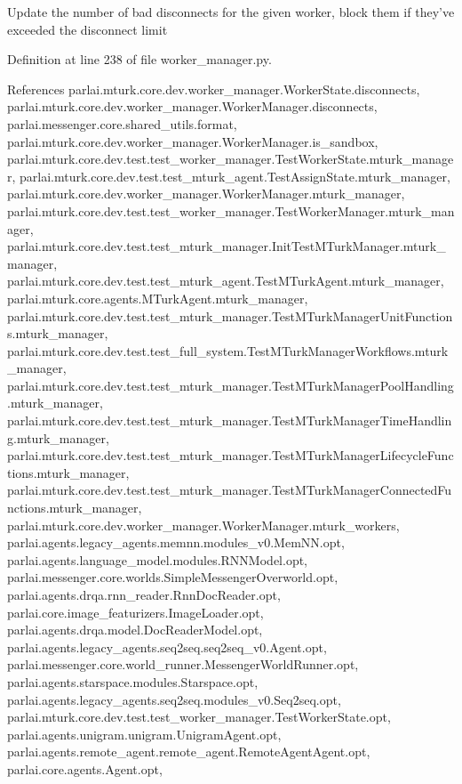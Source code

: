 \begin{DoxyVerb}Update the number of bad disconnects for the given worker, block
them if they've exceeded the disconnect limit
\end{DoxyVerb}
 

Definition at line 238 of file worker\+\_\+manager.\+py.



References parlai.\+mturk.\+core.\+dev.\+worker\+\_\+manager.\+Worker\+State.\+disconnects, parlai.\+mturk.\+core.\+dev.\+worker\+\_\+manager.\+Worker\+Manager.\+disconnects, parlai.\+messenger.\+core.\+shared\+\_\+utils.\+format, parlai.\+mturk.\+core.\+dev.\+worker\+\_\+manager.\+Worker\+Manager.\+is\+\_\+sandbox, parlai.\+mturk.\+core.\+dev.\+test.\+test\+\_\+worker\+\_\+manager.\+Test\+Worker\+State.\+mturk\+\_\+manager, parlai.\+mturk.\+core.\+dev.\+test.\+test\+\_\+mturk\+\_\+agent.\+Test\+Assign\+State.\+mturk\+\_\+manager, parlai.\+mturk.\+core.\+dev.\+worker\+\_\+manager.\+Worker\+Manager.\+mturk\+\_\+manager, parlai.\+mturk.\+core.\+dev.\+test.\+test\+\_\+worker\+\_\+manager.\+Test\+Worker\+Manager.\+mturk\+\_\+manager, parlai.\+mturk.\+core.\+dev.\+test.\+test\+\_\+mturk\+\_\+manager.\+Init\+Test\+M\+Turk\+Manager.\+mturk\+\_\+manager, parlai.\+mturk.\+core.\+dev.\+test.\+test\+\_\+mturk\+\_\+agent.\+Test\+M\+Turk\+Agent.\+mturk\+\_\+manager, parlai.\+mturk.\+core.\+agents.\+M\+Turk\+Agent.\+mturk\+\_\+manager, parlai.\+mturk.\+core.\+dev.\+test.\+test\+\_\+mturk\+\_\+manager.\+Test\+M\+Turk\+Manager\+Unit\+Functions.\+mturk\+\_\+manager, parlai.\+mturk.\+core.\+dev.\+test.\+test\+\_\+full\+\_\+system.\+Test\+M\+Turk\+Manager\+Workflows.\+mturk\+\_\+manager, parlai.\+mturk.\+core.\+dev.\+test.\+test\+\_\+mturk\+\_\+manager.\+Test\+M\+Turk\+Manager\+Pool\+Handling.\+mturk\+\_\+manager, parlai.\+mturk.\+core.\+dev.\+test.\+test\+\_\+mturk\+\_\+manager.\+Test\+M\+Turk\+Manager\+Time\+Handling.\+mturk\+\_\+manager, parlai.\+mturk.\+core.\+dev.\+test.\+test\+\_\+mturk\+\_\+manager.\+Test\+M\+Turk\+Manager\+Lifecycle\+Functions.\+mturk\+\_\+manager, parlai.\+mturk.\+core.\+dev.\+test.\+test\+\_\+mturk\+\_\+manager.\+Test\+M\+Turk\+Manager\+Connected\+Functions.\+mturk\+\_\+manager, parlai.\+mturk.\+core.\+dev.\+worker\+\_\+manager.\+Worker\+Manager.\+mturk\+\_\+workers, parlai.\+agents.\+legacy\+\_\+agents.\+memnn.\+modules\+\_\+v0.\+Mem\+N\+N.\+opt, parlai.\+agents.\+language\+\_\+model.\+modules.\+R\+N\+N\+Model.\+opt, parlai.\+messenger.\+core.\+worlds.\+Simple\+Messenger\+Overworld.\+opt, parlai.\+agents.\+drqa.\+rnn\+\_\+reader.\+Rnn\+Doc\+Reader.\+opt, parlai.\+core.\+image\+\_\+featurizers.\+Image\+Loader.\+opt, parlai.\+agents.\+drqa.\+model.\+Doc\+Reader\+Model.\+opt, parlai.\+agents.\+legacy\+\_\+agents.\+seq2seq.\+seq2seq\+\_\+v0.\+Agent.\+opt, parlai.\+messenger.\+core.\+world\+\_\+runner.\+Messenger\+World\+Runner.\+opt, parlai.\+agents.\+starspace.\+modules.\+Starspace.\+opt, parlai.\+agents.\+legacy\+\_\+agents.\+seq2seq.\+modules\+\_\+v0.\+Seq2seq.\+opt, parlai.\+mturk.\+core.\+dev.\+test.\+test\+\_\+worker\+\_\+manager.\+Test\+Worker\+State.\+opt, parlai.\+agents.\+unigram.\+unigram.\+Unigram\+Agent.\+opt, parlai.\+agents.\+remote\+\_\+agent.\+remote\+\_\+agent.\+Remote\+Agent\+Agent.\+opt, parlai.\+core.\+agents.\+Agent.\+opt, 